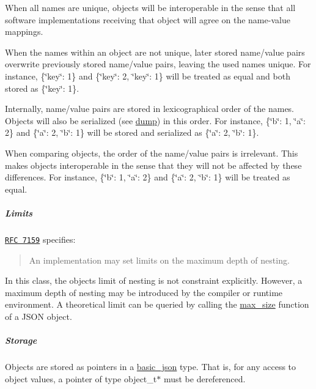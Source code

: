 \begin{DoxyItemize}
\item When all names are unique, objects will be interoperable in the sense that all software implementations receiving that object will agree on the name-\/value mappings.
\item When the names within an object are not unique, later stored name/value pairs overwrite previously stored name/value pairs, leaving the used names unique. For instance, {\ttfamily \{\char`\"{}key\char`\"{}\+: 1\}} and {\ttfamily \{\char`\"{}key\char`\"{}\+: 2, \char`\"{}key\char`\"{}\+: 1\}} will be treated as equal and both stored as {\ttfamily \{\char`\"{}key\char`\"{}\+: 1\}}.
\item Internally, name/value pairs are stored in lexicographical order of the names. Objects will also be serialized (see \hyperlink{a00025_a805e3f3a2f374da0e14942eec7400e40}{dump}) in this order. For instance, {\ttfamily \{\char`\"{}b\char`\"{}\+: 1, \char`\"{}a\char`\"{}\+: 2\}} and {\ttfamily \{\char`\"{}a\char`\"{}\+: 2, \char`\"{}b\char`\"{}\+: 1\}} will be stored and serialized as {\ttfamily \{\char`\"{}a\char`\"{}\+: 2, \char`\"{}b\char`\"{}\+: 1\}}.
\item When comparing objects, the order of the name/value pairs is irrelevant. This makes objects interoperable in the sense that they will not be affected by these differences. For instance, {\ttfamily \{\char`\"{}b\char`\"{}\+: 1, \char`\"{}a\char`\"{}\+: 2\}} and {\ttfamily \{\char`\"{}a\char`\"{}\+: 2, \char`\"{}b\char`\"{}\+: 1\}} will be treated as equal.
\end{DoxyItemize}

\subparagraph*{Limits}

\href{http://rfc7159.net/rfc7159}{\tt R\+FC 7159} specifies\+: \begin{quote}
An implementation may set limits on the maximum depth of nesting. \end{quote}


In this class, the object\textquotesingle{}s limit of nesting is not constraint explicitly. However, a maximum depth of nesting may be introduced by the compiler or runtime environment. A theoretical limit can be queried by calling the \hyperlink{a00025_ad5514a7435f246fc5335856465022a7a}{max\+\_\+size} function of a J\+S\+ON object.

\subparagraph*{Storage}

Objects are stored as pointers in a \hyperlink{a00025}{basic\+\_\+json} type. That is, for any access to object values, a pointer of type {\ttfamily object\+\_\+t$\ast$} must be dereferenced.

